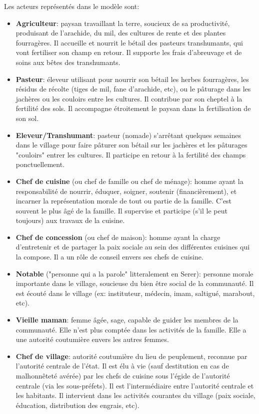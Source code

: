 \begin{paracol}{2}
  \switchcolumn %
  Les acteurs représentés dans le modèle sont:
  \begin{itemize}
    \item \textbf{Agriculteur}: paysan travaillant la terre, soucieux de sa productivité, produisant de l'arachide, du mil, des cultures de rente et des plantes fourragères. Il accueille et nourrit le bétail des pasteurs transhumants, qui vont fertiliser son champ en retour. Il supporte les frais d'abreuvage et de soins aux bêtes des transhumants.
    \item \textbf{Pasteur}: éleveur utilisant pour nourrir son bétail les herbes fourragères, les résidus de récolte (tiges de mil, fane d'arachide, etc), ou le pâturage dans les jachères ou les couloirs entre les cultures. Il contribue par son cheptel à la fertilité des sols. Il accompagne étroitement le paysan dans la fertilisation de son sol.
    \item \textbf{Eleveur/Transhumant}: pasteur (nomade) s'arrêtant quelques semaines dans le village pour faire pâturer son bétail sur les jachères et les pâturages "couloirs" entrer les cultures. Il participe en retour à la fertilité des champs ponctuellement.
    \item \textbf{Chef de cuisine} (ou chef de famille ou chef de ménage): homme ayant la responsabilité de nourrir, éduquer, soigner, soutenir (financièrement), et incarner la représentation morale de tout ou partie de la famille. C'est souvent le plus âgé de la famille. Il supervise et participe (s'il le peut toujours) aux travaux de la cuisine.
    \item \textbf{Chef de concession} (ou chef de maison): homme ayant la charge d'entretenir et de partager la paix sociale au sein des différentes cuisines qui la compose. Il a un rôle de conseil envers ses chefs de cuisine.
    \item \textbf{Notable} ("personne qui a la parole" litteralement en Serer): personne morale importante dans le village, soucieuse du bien être social de la communauté. Il est écouté dans le village (ex: instituteur, médecin, imam, saltigué, marabout, etc).
    \item \textbf{Vieille maman}:  femme âgée, sage, capable de guider les membres de la communauté. Elle n'est plus comptée dans les activités de la famille. Elle a une autorité coutumière envers les autres femmes.
    \item \textbf{Chef de village}: autorité coutumière du lieu de peuplement, reconnue par l'autorité centrale de l'état. Il est élu à vie (sauf destitution en cas de malhonnêteté avérée) par les chefs de cuisine sous l'égide de l'autorité centrale (via les sous-préfets). Il est l'intermédiaire entre l'autorité centrale et les habitants. Il intervient dans les activités courantes du village (paix sociale, éducation, distribution des engrais, etc).

\end{itemize}
\end{paracol}
